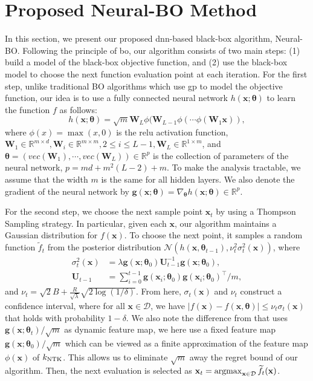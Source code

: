 \section{Proposed Neural-BO Method}
\label{section:neural-bo_proposed_method}
In this section, we present our proposed \ac{dnn}-based black-box algorithm, Neural-BO. Following the principle of \ac{bo}, our algorithm consists of two main steps: (1) build a model of the black-box objective function, and (2) use the black-box model to choose the next function evaluation point at each iteration. For the first step, unlike traditional BO algorithms which use \ac{gp} to model the objective function, our idea is to use a fully connected neural network $h(\mathbf{x}; \boldsymbol{\theta})$ to learn the function $f$ as follows:
$$ h(\mathbf{x};\boldsymbol{\theta}) = \sqrt{m} \mathbf{W}_L \phi(\mathbf{W}_{L-1}\phi(\cdots\phi(\mathbf{W}_1 \mathbf{x})), $$
where $\phi(x) = \max(x,0)$ is the \ac{relu} activation function, $\mathbf{W}_1 \in \mathbb{R}^{m \times d}, \mathbf{W}_i \in \mathbb{R}^{m \times m}, 2\leq i \leq L-1, \mathbf{W}_L \in \mathbb{R}^{1 \times m}$, and $\boldsymbol{\theta} = (vec(\mathbf{W}_1),\cdots, vec(\mathbf{W}_L)) \in \mathbb{R}^p$ is the collection of parameters of the neural network, $p=md+m^2(L-2)+m$. To make the analysis tractable, we assume that the width $m$ is the same for all hidden layers. We also denote the gradient of the neural network by $\mathbf{g}(\mathbf{x}; \boldsymbol{\theta}) = \nabla_{\boldsymbol{\theta}}h(\mathbf{x}; \boldsymbol{\theta}) \in \mathbb{R}^p$.

For the second step, we choose the next sample point $\mathbf{x}_t$ by using a Thompson Sampling strategy. In particular, given each $\mathbf{x}$, our algorithm maintains a Gaussian distribution for $f(\mathbf{x})$. To choose the next point, it samples a random function $\widetilde{f}_t$ from the posterior distribution $\mathcal{N}(h(\mathbf{x}, \boldsymbol{\theta}_{t-1}), \nu_t^2 \sigma^2_t (\mathbf{x}))$, where 
\begin{align*}
\sigma^2_t (\mathbf{x}) &= \lambda \mathbf{g}(\mathbf{x};\boldsymbol{\theta}_0)\mathbf{U}_{t-1}^{-1}\mathbf{g}(\mathbf{x};\boldsymbol{\theta}_0),
\\
\mathbf{U}_{t-1} &= \sum_{i=0}^{t-1} \mathbf{g}(\mathbf{x}_i;\boldsymbol{\theta}_0)\mathbf{g}(\mathbf{x}_i; \boldsymbol{\theta}_0)^\top/m,
\end{align*}
and $\nu_t = \sqrt{2}B +\frac{R}{\sqrt{\lambda}} \sqrt{2 \log(1/ \delta)}$. From here, $\sigma_t(\mathbf{x})$ and $\nu_t$ construct a confidence interval, where for all $\mathbf{x} \in \mathcal{D}$, we have $\lvert  f(\mathbf{x}) - f(\mathbf{x}, \boldsymbol{\theta}) \rvert \leq \nu_t\sigma_t(\mathbf{x})$ that holds with probability $1-\delta$. We also note the difference from \citet{zhang2021neural} that uses $\mathbf{g}(\mathbf{x};\boldsymbol{\theta}_t)/\sqrt{m}$ as dynamic feature map, we here use a fixed feature map $\mathbf{g}(\mathbf{x};\boldsymbol{\theta}_0)/\sqrt{m}$ which can be viewed as a finite approximation of the feature map $\phi(\mathbf{x})$ of $k_\textup{NTK}$. This allows us to eliminate $\sqrt{m}$ away the regret bound of our algorithm. Then, the next evaluation is selected as $\mathbf{x}_t = \operatorname*{argmax}_{\mathbf{x} \in \mathcal{D}} \widetilde{f_t}(\mathbf{x})$. 

